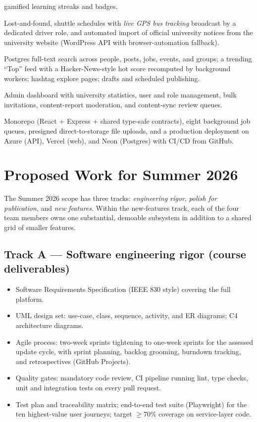 \documentclass[11pt, a4paper]{article}
\begin{document}
\begin{description}[leftmargin=1.5em, itemsep=2pt]
    gamified learning streaks and badges.
    \item[Campus services] Lost-and-found, shuttle schedules with
    \emph{live GPS bus tracking} broadcast by a dedicated driver role, and
    automated import of official university notices from the university
    website (WordPress API with browser-automation fallback).
    \item[Discovery \& ranking] Postgres full-text search across people,
    posts, jobs, events, and groups; a trending ``Top'' feed with a
    Hacker-News-style hot score recomputed by background workers; hashtag
    explore pages; drafts and scheduled publishing.
    \item[Administration] Admin dashboard with university statistics, user
    and role management, bulk invitations, content-report moderation, and
    content-sync review queues.
    \item[Infrastructure] Monorepo (React + Express + shared type-safe
    contracts), eight background job queues, presigned direct-to-storage
    file uploads, and a production deployment on Azure (API), Vercel (web),
    and Neon (Postgres) with CI/CD from GitHub.
\end{description}

\section{Proposed Work for Summer 2026}
\label{sec:proposed}

The Summer 2026 scope has three tracks: \emph{engineering rigor},
\emph{polish for publication}, and \emph{new features}. Within the new-features
track, each of the four team members owns one substantial, demoable
subsystem in addition to a shared grid of smaller features.

\subsection{Track A --- Software engineering rigor (course deliverables)}
\begin{itemize}[leftmargin=1.5em, itemsep=2pt]
    \item Software Requirements Specification (IEEE 830 style) covering the
    full platform.
    \item UML design set: use-case, class, sequence, activity, and ER
    diagrams; C4 architecture diagrams.
    \item Agile process: two-week sprints tightening to one-week sprints for
    the assessed update cycle, with sprint planning, backlog grooming,
    burndown tracking, and retrospectives (GitHub Projects).
    \item Quality gates: mandatory code review, CI pipeline running lint,
    type checks, unit and integration tests on every pull request.
    \item Test plan and traceability matrix; end-to-end test suite
    (Playwright) for the ten highest-value user journeys; target
    $\geq 70\%$ coverage on service-layer code.
\end{itemize}
\end{document}
